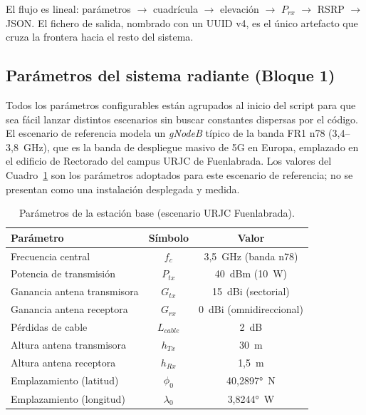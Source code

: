 El flujo es lineal: parámetros $\rightarrow$ cuadrícula $\rightarrow$ elevación
$\rightarrow$ $P_{rx}$ $\rightarrow$ RSRP $\rightarrow$ JSON. El fichero de salida, nombrado
con un UUID v4, es el único artefacto que cruza la frontera hacia el resto del sistema.

\subsection{Parámetros del sistema radiante (Bloque 1)}
\label{sec:matlab_params}

Todos los parámetros configurables están agrupados al inicio del script para que sea fácil
lanzar distintos escenarios sin buscar constantes dispersas por el código. El escenario de
referencia modela un \textit{gNodeB} típico de la banda FR1 n78 (3,4--3,8~GHz), que es
la banda de despliegue masivo de 5G en Europa, emplazado en el edificio de Rectorado del
campus URJC de Fuenlabrada. Los valores del Cuadro~\ref{tab:params_antena} son los parámetros adoptados para este
escenario de referencia; no se presentan como una instalación desplegada y medida.

\begin{table}[H]
\centering
\caption{Parámetros de la estación base (escenario URJC Fuenlabrada).}
\label{tab:params_antena}
\begin{tabular}{|l|c|c|}
\hline
\textbf{Parámetro} & \textbf{Símbolo} & \textbf{Valor} \\
\hline
Frecuencia central           & $f_c$         & 3,5~GHz (banda n78) \\
Potencia de transmisión      & $P_{tx}$      & 40~dBm (10~W) \\
Ganancia antena transmisora  & $G_{tx}$      & 15~dBi (sectorial) \\
Ganancia antena receptora    & $G_{rx}$      & 0~dBi (omnidireccional) \\
Pérdidas de cable            & $L_{cable}$   & 2~dB \\
Altura antena transmisora    & $h_{Tx}$      & 30~m \\
Altura antena receptora      & $h_{Rx}$      & 1,5~m \\
Emplazamiento (latitud)      & $\phi_0$      & 40,2897°~N \\
Emplazamiento (longitud)     & $\lambda_0$   & 3,8244°~W \\
\hline
\end{tabular}
\end{table}

